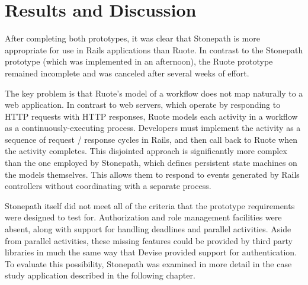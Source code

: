 \documentclass[document.tex]{subfiles}
\begin{document}
\FloatBarrier

\section {Results and Discussion}

After completing both prototypes, it was clear that Stonepath is more appropriate for use in Rails applications than Ruote. In contrast to the Stonepath prototype (which was implemented in an afternoon), the Ruote prototype remained incomplete and was canceled after several weeks of effort.

The key problem is that Ruote's model of a workflow does not map naturally to a web application. In contrast to web servers, which operate by responding to HTTP requests with HTTP responses, Ruote models each activity in a workflow as a continuously-executing process. Developers must implement the activity as a sequence of request / response cycles in Rails, and then call back to Ruote when the activity completes. This disjointed approach is significantly more complex than the one employed by Stonepath, which defines persistent state machines on the models themselves. This allows them to respond to events generated by Rails controllers without coordinating with a separate process.

Stonepath itself did not meet all of the criteria that the prototype requirements were designed to test for. Authorization and role management facilities were absent, along with support for handling deadlines and parallel activities. Aside from parallel activities, these missing features could be provided by third party libraries in much the same way that Devise provided support for authentication. To evaluate this possibility, Stonepath was examined in more detail in the case study application described in the following chapter.
\end{document}
